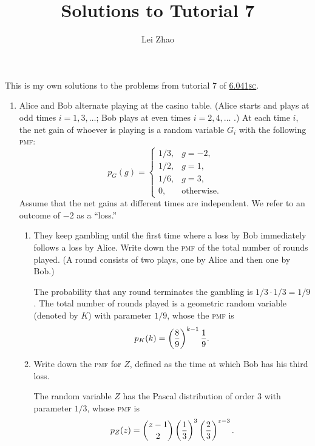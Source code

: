 

\title{Solutions to Tutorial 7}
\author{Lei Zhao}


\maketitle

This is my own solutions to the problems from tutorial 7 of
\href{https://ocw.mit.edu/courses/electrical-engineering-and-computer-science/6-041sc-probabilistic-systems-analysis-and-applied-probability-fall-2013/unit-iii/lecture-13/}{6.041\textsc{sc}}.

\begin{enumerate}
\item Alice and Bob alternate playing at the casino table.  (Alice
  starts and plays at odd times \(i = 1, 3, \dots\); Bob plays at even
  times \(i = 2, 4, \dots\) .)  At each time \(i\), the net gain of
  whoever is playing is a random variable \(G_i\) with the following
  \textsc{pmf}:
  \[p_G(g) =
    \begin{cases}
      1/3, & g = -2, \\
      1/2, & g = 1,  \\
      1/6, & g = 3,  \\
      0,       & \text{otherwise}.
    \end{cases}\]
  Assume that the net gains at different times are independent.  We
  refer to an outcome of \(−2\) as a “loss.”
  \begin{enumerate} \parasp
  \item They keep gambling until the first time where a loss by Bob
    immediately follows a loss by Alice.  Write down the \textsc{pmf} of the
    total number of rounds played.  (A round consists of two plays,
    one by Alice and then one by Bob.)

    The probability that any round terminates the gambling is
    \(1/3 \cdot 1/3 = 1/9\).  The total number of rounds played is a
    geometric random variable (denoted by \(K\)) with parameter \(1/9\), whose the
    \textsc{pmf} is
    \[p_K(k) = \left( \frac89 \right)^{k-1} \frac19.\]

  \item Write down the \textsc{pmf} for \(Z\), defined as the time at
    which Bob has his third loss.

    The random variable \(Z\) has the Pascal distribution of order
    \(3\) with parameter \(1/3\), whose \textsc{pmf} is
    \[p_Z(z) = {z-1 \choose 2} \left( \frac13 \right)^3\left( \frac23 \right)^{z-3}.\]


\end{enumerate}
\end{enumerate}
